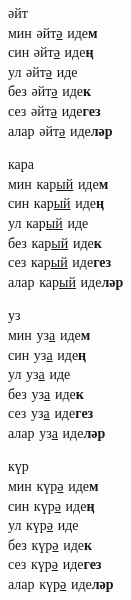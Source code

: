\begin{multicols}{4}
\begin{enumerate}
\begin{minipage}{\linewidth}
    \item
    әйт\\
    мин әйт\underline{ә} иде\textbf{м}\\
    син әйт\underline{ә} иде\textbf{ң}\\
    ул әйт\underline{ә} иде\\
    без әйт\underline{ә} иде\textbf{к}\\
    сез әйт\underline{ә} иде\textbf{гез}\\
    алар әйт\underline{ә} иде\textbf{ләр}\\
\end{minipage}

\begin{minipage}{\linewidth}
    \item
    кара\\
    мин кар\underline{ый} иде\textbf{м}\\
    син кар\underline{ый} иде\textbf{ң}\\
    ул кар\underline{ый} иде\\
    без кар\underline{ый} иде\textbf{к}\\
    сез кар\underline{ый} иде\textbf{гез}\\
    алар кар\underline{ый} иде\textbf{ләр}\\
\end{minipage}

\begin{minipage}{\linewidth}
    \item
    уз\\
    мин уз\underline{а} иде\textbf{м}\\
    син уз\underline{а} иде\textbf{ң}\\
    ул уз\underline{а} иде\\
    без уз\underline{а} иде\textbf{к}\\
    сез уз\underline{а} иде\textbf{гез}\\
    алар уз\underline{а} иде\textbf{ләр}\\
\end{minipage}

\begin{minipage}{\linewidth}
    \item
    күр\\
    мин күр\underline{ә} иде\textbf{м}\\
    син күр\underline{ә} иде\textbf{ң}\\
    ул күр\underline{ә} иде\\
    без күр\underline{ә} иде\textbf{к}\\
    сез күр\underline{ә} иде\textbf{гез}\\
    алар күр\underline{ә} иде\textbf{ләр}\\
\end{minipage}


\end{enumerate}
\end{multicols}
